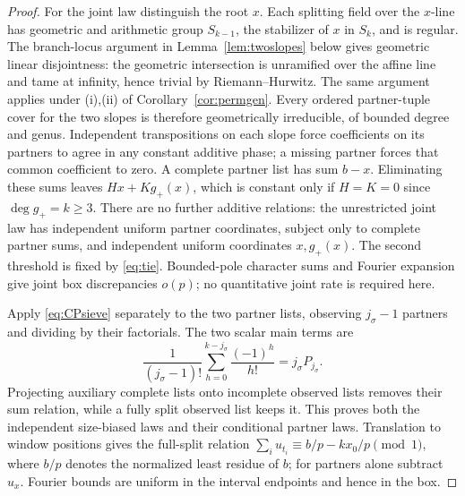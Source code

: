 \begin{proof}
For the joint law distinguish the root $x$.  Each splitting field over the $x$-line has geometric and arithmetic
group $S_{k-1}$, the stabilizer of $x$ in $S_k$, and is regular.
The branch-locus argument in Lemma~\ref{lem:twoslopes} below gives geometric linear disjointness:
the geometric intersection is unramified over the affine line and tame at infinity, hence trivial by Riemann--Hurwitz.
The same argument applies under (i),(ii) of Corollary~\ref{cor:permgen}.
Every ordered partner-tuple cover for the two slopes is therefore geometrically irreducible, of bounded degree and genus.
Independent transpositions on each slope force coefficients on its partners to agree in any constant additive phase;
a missing partner forces that common coefficient to zero.  A complete partner list has sum $b-x$.
Eliminating these sums leaves $Hx+Kg_+(x)$, which is constant only if $H=K=0$ since $\deg g_+=k\ge3$.
There are no further additive relations: the unrestricted joint law has independent uniform partner coordinates,
subject only to complete partner sums, and independent uniform coordinates $x,g_+(x)$.
The second threshold is fixed by \eqref{eq:tie}.  Bounded-pole character sums and Fourier expansion give joint box discrepancies $o(p)$;
no quantitative joint rate is required here.

Apply \eqref{eq:CPsieve} separately to the two partner lists, observing $j_\sigma-1$ partners and dividing by their factorials.
The two scalar main terms are
\[
 \frac1{(j_\sigma-1)!}\sum_{h=0}^{k-j_\sigma}\frac{(-1)^h}{h!}=j_\sigma P_{j_\sigma}.
\]
Projecting auxiliary complete lists onto incomplete observed lists removes their sum relation, while a fully split
observed list keeps it.  This proves both the independent size-biased laws and their conditional partner laws.
Translation to window positions gives the full-split relation
$\sum_i u_{t_i}\equiv b/p-kx_0/p\pmod1$, where $b/p$ denotes the normalized least residue of $b$;
for partners alone subtract $u_x$.  Fourier bounds are uniform in the interval endpoints and hence in the box.
\end{proof}

